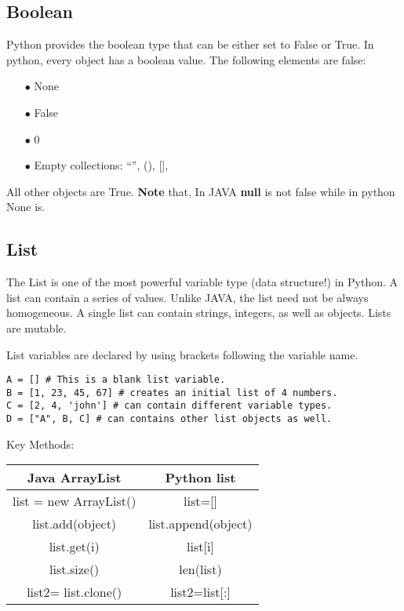 \documentclass[a4paper,9pt]{extarticle}
\begin{document}
\begin{multicols*}{2}
\subsection{Boolean}
Python provides the boolean type that can be either set to False or True.
In python, every object has a boolean value. The following elements are false:
\begin{itemize}
  \item[$\bullet$] None
  \item[$\bullet$] False
  \item[$\bullet$] 0
  \item[$\bullet$] Empty collections: “”, (), [], {}
\end{itemize}

All other objects are True.
\textbf{Note} that, In JAVA \textbf{null} is not false while in python None is.

\subsection{List}
The List is one of the most powerful variable type (data structure!) in Python. A list can contain a series of values. Unlike JAVA, the list need not be always homogeneous. A single list can contain strings, integers, as well as objects. Lists are mutable.

List variables are declared by using brackets \boxed{[ ]} following the variable name.

\begin{lstlisting}
A = [] # This is a blank list variable.
B = [1, 23, 45, 67] # creates an initial list of 4 numbers.
C = [2, 4, 'john'] # can contain different variable types.
D = ["A", B, C] # can contains other list objects as well.
\end{lstlisting}

Key Methods:
\begin{center}
 \begin{tabular}{||c | c||}
 \hline
 Java ArrayList & Python list\\ [1ex]
 \hline\hline
 list = new ArrayList() & list=[]\\
 \hline
 list.add(object) & list.append(object)\\
 \hline
 list.get(i) & list[i]\\
 \hline
 list.size() & len(list)\\
 \hline
 list2= list.clone() & list2=list[:]\\
 \hline
\end{tabular}
\end{center}


\end{multicols*}
\end{document}
